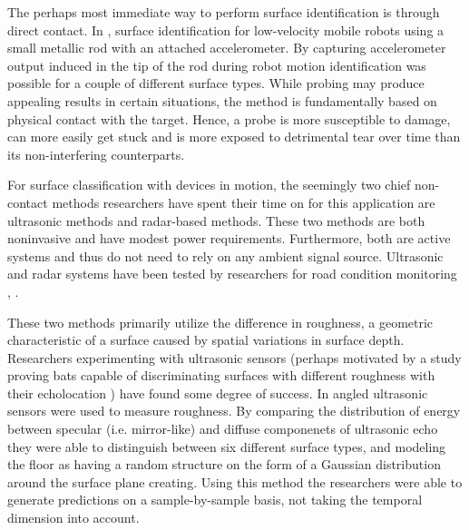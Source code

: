 The perhaps most immediate way to perform surface identification is through direct contact. In \citep{giguere_dudek_2011}, surface identification for low-velocity mobile robots using a small metallic rod with an attached accelerometer. By capturing accelerometer output induced in the tip of the rod during robot motion identification was possible for a couple of different surface types. While probing may produce appealing results in certain situations, the method is fundamentally based on physical contact with the target. Hence, a probe is more susceptible to damage, can more easily get stuck and is more exposed to detrimental tear over time than its non-interfering counterparts.

For surface classification with devices in motion, the seemingly two chief non-contact methods researchers have spent their time on for this application are ultrasonic methods and radar-based methods. These two methods are both noninvasive and have modest power requirements. Furthermore, both are active systems and thus do not need to rely on any ambient signal source. Ultrasonic and radar systems have been tested by researchers for road condition monitoring \citep{bystrov_2016}, \citep{mckerrow_kristiansen_2006}. 

These two methods primarily utilize the difference in roughness, a geometric characteristic of a surface caused by spatial variations in surface depth. Researchers experimenting with ultrasonic sensors (perhaps motivated by a study proving bats capable of discriminating surfaces with different roughness with their echolocation \citep{schmidt_1988}) have found some degree of success. In \citep{politis_probert_1999} angled ultrasonic sensors were used to measure roughness. By comparing the distribution of energy between specular (i.e. mirror-like) and diffuse componenets of ultrasonic echo they were able to distinguish between six different surface types, and modeling the floor as having a random structure on the form of a Gaussian distribution around the surface plane creating. Using this method the researchers were able to generate predictions on a sample-by-sample basis, not taking the temporal dimension into account.

